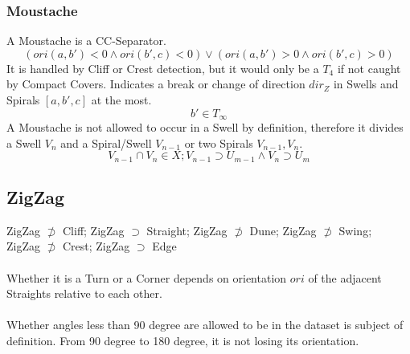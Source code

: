\documentclass{report}
\begin{document}
\subsubsection{Moustache}
A Moustache is a CC-Separator.
\begin{equation}
(ori(a,b')<0\land ori(b',c)<0)\lor (ori(a,b')>0\land ori(b',c)>0)
\end{equation}
It is handled by Cliff or Crest detection, but it would only be a $T_{4}$ if not caught by Compact Covers. Indicates a break or change of direction $dir_{Z}$ in Swells and Spirals $[a,b',c]$ at the most.
\begin{equation}
b' \in T_{\infty}
\end{equation}
A Moustache is not allowed to occur in a Swell by definition, therefore it divides a Swell $V_{n}$ and a Spiral/Swell $V_{n-1}$ or two Spirals $V_{n-1},V_{n}$.
\begin{equation}
V_{n-1}\cap V_{n}\in X; V_{n-1}\supset U_{m-1}\land V_{n}\supset U_{m}
\end{equation}

\subsection{ZigZag}
ZigZag $\not\supset$ Cliff; ZigZag $\supset$ Straight; ZigZag $\not\supset$ Dune; ZigZag $\not\supset$ Swing;\\ ZigZag $\not\supset$ Crest; ZigZag $\supset$ Edge\\\\
Whether it is a Turn or a Corner depends on orientation $ori$ of the adjacent Straights relative to each other.\\\\
Whether angles less than 90 degree are allowed to be in the dataset is subject of definition.
From 90 degree to 180 degree, it is not losing its orientation.
\end{document}
